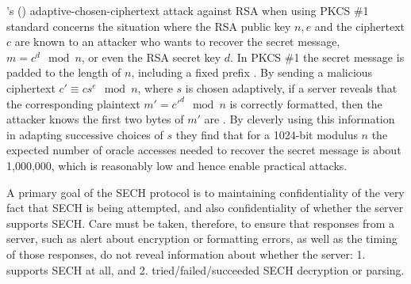 \citeauthor{bleichenbacher1998chosen}'s (\citeyear{bleichenbacher1998chosen}) adaptive-chosen-ciphertext attack against \ac{RSA} when using  \ac{PKCS} \#1 standard concerns the situation where
the \ac{RSA} public key $n,e$ and the ciphertext $c$
are known to an attacker who wants to recover the secret message, $m=c^d\mod n$, or even
the \ac{RSA} secret key $d$.
In \ac{PKCS} \#1 the secret message is padded to the length of $n$, including a fixed prefix .
By sending a malicious ciphertext $c'\equiv cs^e\mod n$, where $s$ is chosen adaptively, if a server reveals that the corresponding plaintext $m'=c'^d\mod n$ is correctly formatted, then the attacker knows the first two bytes of $m'$ are .
By cleverly using this information in adapting successive choices of $s$ they find that for a 1024-bit modulus $n$ the expected number of oracle accesses needed to recover the secret message is about 1,000,000, which is reasonably low and hence enable practical attacks.

A primary goal of the \ac{SECH} protocol is to maintaining confidentiality of the very fact that \ac{SECH} is being attempted, and also confidentiality of whether the server supports \ac{SECH}. Care must be taken, therefore, to ensure that responses from a server, such as alert about encryption or formatting errors, as well as the timing of those responses, do not reveal information about whether the server: 1. supports \ac{SECH} at all, and 2. tried/failed/succeeded \ac{SECH} decryption or parsing.